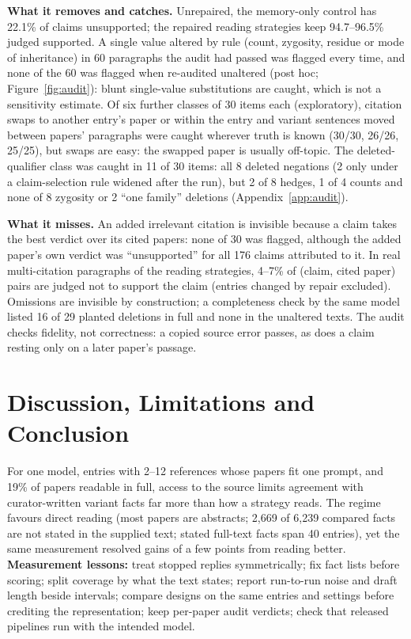 \documentclass{article} %
\begin{document}
\textbf{What it removes and catches.} Unrepaired, the memory-only control has 22.1\% of claims unsupported; the repaired reading strategies keep 94.7--96.5\% judged supported. A single value altered by rule (count, zygosity, residue or mode of inheritance) in 60 paragraphs the audit had passed was flagged every time, and none of the 60 was flagged when re-audited unaltered (post hoc; Figure~\ref{fig:audit}): blunt single-value substitutions are caught, which is not a sensitivity estimate. Of six further classes of 30 items each (exploratory), citation swaps to another entry's paper or within the entry and variant sentences moved between papers' paragraphs were caught wherever truth is known (30/30, 26/26, 25/25), but swaps are easy: the swapped paper is usually off-topic. The deleted-qualifier class was caught in 11 of 30 items: all 8 deleted negations (2 only under a claim-selection rule widened after the run), but 2 of 8 hedges, 1 of 4 counts and none of 8 zygosity or 2 ``one family'' deletions (Appendix~\ref{app:audit}).

\textbf{What it misses.} An added irrelevant citation is invisible because a claim takes the best verdict over its cited papers: none of 30 was flagged, although the added paper's own verdict was ``unsupported'' for all 176 claims attributed to it. In real multi-citation paragraphs of the reading strategies, 4--7\% of (claim, cited paper) pairs are judged not to support the claim (entries changed by repair excluded). Omissions are invisible by construction; a completeness check by the same model listed 16 of 29 planted deletions in full and none in the unaltered texts. The audit checks fidelity, not correctness: a copied source error passes, as does a claim resting only on a later paper's passage.

\section{Discussion, Limitations and Conclusion}
\label{sec:discussion}
For one model, entries with 2--12 references whose papers fit one prompt, and 19\% of papers readable in full, access to the source limits agreement with curator-written variant facts far more than how a strategy reads. The regime favours direct reading (most papers are abstracts; 2,669 of 6,239 compared facts are not stated in the supplied text; stated full-text facts span 40 entries), yet the same measurement resolved gains of a few points from reading better. \textbf{Measurement lessons:} treat stopped replies symmetrically; fix fact lists before scoring; split coverage by what the text states; report run-to-run noise and draft length beside intervals; compare designs on the same entries and settings before crediting the representation; keep per-paper audit verdicts; check that released pipelines run with the intended model.
\end{document}
